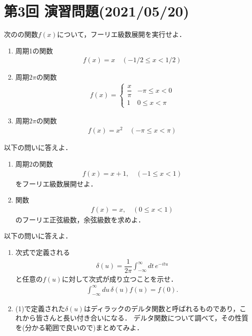 \section*{第3回 演習問題(2021/05/20)}
%
\enshu
%
次のの関数$f(x)$について，フーリエ級数展開を実行せよ．
\begin{enumerate}[(1)]
  \item 周期1の関数 
	\begin{align*}
	  f(x)=x \quad (-1/2\leq x < 1/2)
	\end{align*}
  \item 周期$2\pi$の関数 
	\begin{align*}
	  f(x) = 
	  \begin{cases}
	    \dfrac{x}{\pi} & -\pi \leq x < 0 \\
            1              & 0 \leq x < \pi 
	  \end{cases}
	\end{align*}
  \item 周期$2\pi$の関数
	\begin{align*}
	  f(x) = x^2\quad (-\pi \leq x < \pi)
	\end{align*}
\end{enumerate}
%
\enshu
以下の問いに答えよ．
\begin{enumerate}[(1)]
  \item 周期$2$の関数
	\begin{align*}
	  f(x) = x+1, \quad (-1\leq x < 1) 
	\end{align*}
	をフーリエ級数展開せよ．
  \item 関数
	\begin{align*}
	  f(x) = x, \quad (0\leq x < 1) 
	\end{align*}
	のフーリエ正弦級数，余弦級数を求めよ．
\end{enumerate}

%
\enshu
%
以下の問いに答えよ．
\begin{enumerate}[(1)]
\item 
次式で定義される
\begin{align*}
 \delta (u) = \dfrac{1}{2\pi}\int_{-\infty}^{\infty}dt\,e^{-itu}
\end{align*}
と任意の$f(u)$に対して次式が成り立つことを示せ．
\begin{align*}
 \int_{-\infty}^{\infty}du\,\delta(u)f(u)=f(0). 
\end{align*}
\item (1)で定義された$\delta(u)$はディラックのデルタ関数と呼ばれるものであり，これから皆さんと長い付き合いになる．
      デルタ関数について調べて，その性質を(分かる範囲で良いので)まとめてみよ．
\end{enumerate}